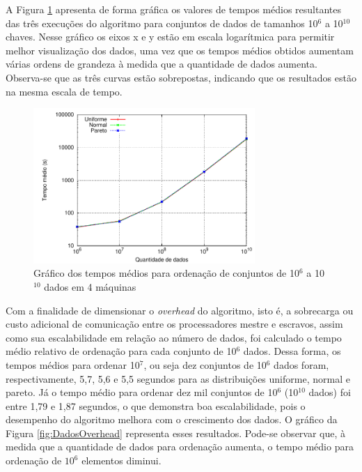 A Figura \ref{fig:DadosTempo} apresenta de forma gráfica os valores de tempos médios resultantes das três execuções do algoritmo para conjuntos de dados de tamanhos 10$^6$  a 10$^{10}$ chaves. Nesse gráfico os eixos x e y estão em escala logarítmica para permitir melhor visualização dos dados, uma vez que os tempos médios obtidos aumentam várias ordens de grandeza à medida que a quantidade de dados aumenta. Observa-se que as três curvas estão sobrepostas, indicando que os resultados estão na mesma escala de tempo.

\begin{figure}[htb]
\centering
\includegraphics[width=0.75\textwidth]{figuras/DadosTempo.pdf}
\caption{Gráfico dos tempos médios para ordenação de conjuntos de 10$^6$ a 10$^{10}$ dados em 4 máquinas}
\label{fig:DadosTempo}
\end{figure}

Com a finalidade de dimensionar o \textit{overhead} do algoritmo, isto é, a sobrecarga ou custo adicional de comunicação entre os processadores mestre e escravos, assim como sua escalabilidade em relação ao número de dados, foi calculado o tempo médio relativo de ordenação para cada conjunto de 10$^6$ dados. 
Dessa forma, os tempos médios para ordenar 10$^7$, ou seja dez conjuntos de 10$^6$ dados foram, respectivamente, 5,7, 5,6 e 5,5 segundos para as distribuições uniforme, normal e pareto.
Já o tempo médio para ordenar dez mil conjuntos de 10$^6$  (10$^{10}$ dados) foi entre 1,79 e 1,87 segundos, o que demonstra boa escalabilidade, pois o desempenho do algoritmo melhora com o crescimento dos dados. 
O gráfico da Figura \ref{fig:DadosOverhead} representa esses resultados. 
Pode-se observar que, à medida que a quantidade de dados para ordenação aumenta, o tempo médio para ordenação de $10^6$ elementos diminui. 

